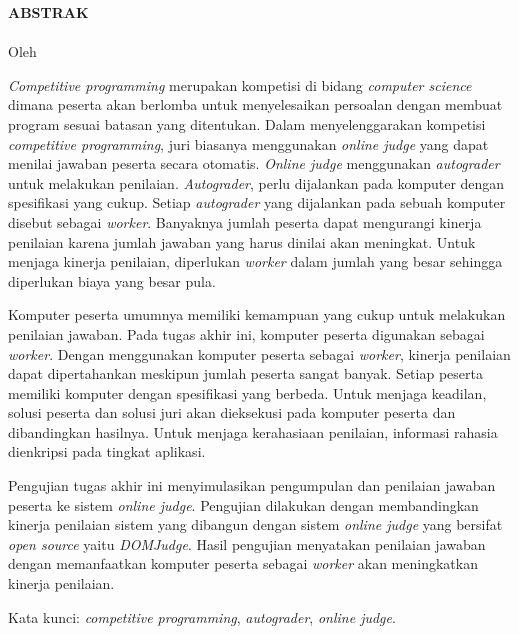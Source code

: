 \clearpage

\begin{center}
    \Large {\bfseries \MakeUppercase{Abstrak}} \\
    \large {\MakeUppercase{\thetitle}} \\
    \normalsize Oleh \theauthor
\end{center}

\par \textit{Competitive programming} merupakan kompetisi di bidang \textit{computer science} dimana peserta akan berlomba untuk menyelesaikan persoalan dengan membuat program sesuai batasan yang ditentukan. Dalam menyelenggarakan kompetisi \textit{competitive programming}, juri biasanya menggunakan \textit{online judge} yang dapat menilai jawaban peserta secara otomatis. \textit{Online judge} menggunakan \textit{autograder} untuk melakukan penilaian. \textit{Autograder}, perlu dijalankan pada komputer dengan spesifikasi yang cukup. Setiap \textit{autograder} yang dijalankan pada sebuah komputer disebut sebagai \textit{worker}. Banyaknya jumlah peserta dapat mengurangi kinerja penilaian karena jumlah jawaban yang harus dinilai akan meningkat. Untuk menjaga kinerja penilaian, diperlukan \textit{worker} dalam jumlah yang besar sehingga diperlukan biaya yang besar pula. 

\par Komputer peserta umumnya memiliki kemampuan yang cukup untuk melakukan penilaian jawaban. Pada tugas akhir ini, komputer peserta digunakan sebagai \textit{worker}. Dengan menggunakan komputer peserta sebagai \textit{worker}, kinerja penilaian dapat dipertahankan meskipun jumlah peserta sangat banyak. Setiap peserta memiliki komputer dengan spesifikasi yang berbeda. Untuk menjaga keadilan, solusi peserta dan solusi juri akan dieksekusi pada komputer peserta dan dibandingkan hasilnya. Untuk menjaga kerahasiaan penilaian, informasi rahasia dienkripsi pada tingkat aplikasi.

\par Pengujian tugas akhir ini menyimulasikan pengumpulan dan penilaian jawaban peserta ke sistem \textit{online judge}. Pengujian dilakukan dengan membandingkan kinerja penilaian sistem yang dibangun dengan sistem \textit{online judge} yang bersifat \textit{open source} yaitu \textit{DOMJudge}. Hasil pengujian menyatakan penilaian jawaban dengan memanfaatkan komputer peserta sebagai \textit{worker} akan meningkatkan kinerja penilaian.

\par Kata kunci: \textit{competitive programming}, \textit{autograder}, \textit{online judge}.
